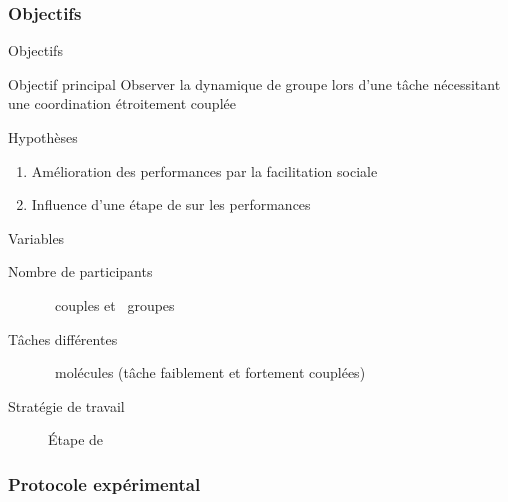 \documentclass[english,french,dvips,10pt]{mybeamer}
\begin{document}
	\subsubsection{Objectifs}
	\begin{myframe}{Objectifs}
		\begin{myblock}{Objectif principal}
			Observer la dynamique de groupe lors d'une tâche nécessitant une coordination étroitement couplée
		\end{myblock}
		\begin{myplusblock}{Hypothèses}
			\begin{enumerate}
				\item Amélioration des performances par la facilitation sociale
				\item Influence d'une étape de \mybrainstorming sur les performances 
			\end{enumerate}
		\end{myplusblock}
		\begin{myblock}{Variables}
			\begin{description}
				\item[Nombre de participants] ~couples et ~groupes
				\item[Tâches différentes] ~molécules (tâche faiblement et fortement couplées)
				\item[Stratégie de travail] Étape de \mybrainstorming
			\end{description}
		\end{myblock}
	\end{myframe}
	\subsubsection{Protocole expérimental}
\end{document}
